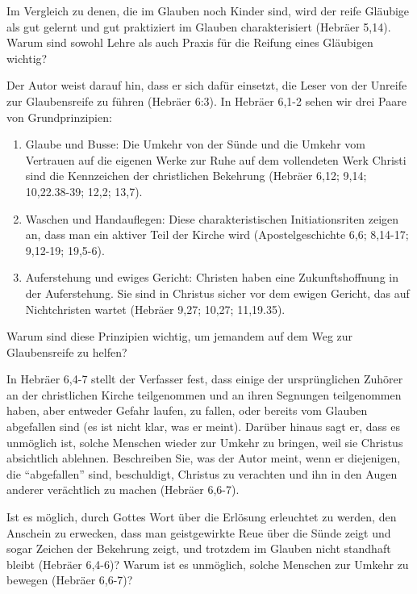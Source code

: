\documentclass[
  12pt,
]{krantz}
\providecommand{\tightlist}{%
  \setlength{\itemsep}{0pt}\setlength{\parskip}{0pt}}
\begin{document}
Im Vergleich zu denen, die im Glauben noch Kinder sind, wird der reife Gläubige als gut gelernt und gut praktiziert im Glauben charakterisiert (Hebräer 5,14). Warum sind sowohl Lehre als auch Praxis für die Reifung eines Gläubigen wichtig?

Der Autor weist darauf hin, dass er sich dafür einsetzt, die Leser von der Unreife zur Glaubensreife zu führen (Hebräer 6:3). In Hebräer 6,1-2 sehen wir drei Paare von Grundprinzipien:

\begin{enumerate}
\def\labelenumi{\arabic{enumi}.}
\tightlist
\item
  Glaube und Busse: Die Umkehr von der Sünde und die Umkehr vom Vertrauen auf die eigenen Werke zur Ruhe auf dem vollendeten Werk Christi sind die Kennzeichen der christlichen Bekehrung (Hebräer 6,12; 9,14; 10,22.38-39; 12,2; 13,7).
\item
  Waschen und Handauflegen: Diese charakteristischen Initiationsriten zeigen an, dass man ein aktiver Teil der Kirche wird (Apostelgeschichte 6,6; 8,14-17; 9,12-19; 19,5-6).
\item
  Auferstehung und ewiges Gericht: Christen haben eine Zukunftshoffnung in der Auferstehung. Sie sind in Christus sicher vor dem ewigen Gericht, das auf Nichtchristen wartet (Hebräer 9,27; 10,27; 11,19.35).
\end{enumerate}

Warum sind diese Prinzipien wichtig, um jemandem auf dem Weg zur Glaubensreife zu helfen?

In Hebräer 6,4-7 stellt der Verfasser fest, dass einige der ursprünglichen Zuhörer an der christlichen Kirche teilgenommen und an ihren Segnungen teilgenommen haben, aber entweder Gefahr laufen, zu fallen, oder bereits vom Glauben abgefallen sind (es ist nicht klar, was er meint). Darüber hinaus sagt er, dass es unmöglich ist, solche Menschen wieder zur Umkehr zu bringen, weil sie Christus absichtlich ablehnen. Beschreiben Sie, was der Autor meint, wenn er diejenigen, die ``abgefallen'' sind, beschuldigt, Christus zu verachten und ihn in den Augen anderer verächtlich zu machen (Hebräer 6,6-7).

Ist es möglich, durch Gottes Wort über die Erlösung erleuchtet zu werden, den Anschein zu erwecken, dass man geistgewirkte Reue über die Sünde zeigt und sogar Zeichen der Bekehrung zeigt, und trotzdem im Glauben nicht standhaft bleibt (Hebräer 6,4-6)? Warum ist es unmöglich, solche Menschen zur Umkehr zu bewegen (Hebräer 6,6-7)?
\end{document}
